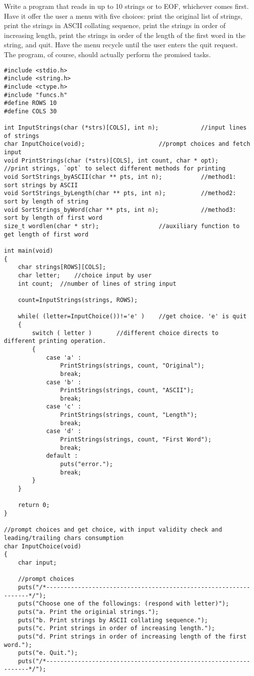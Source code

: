 \begin{question}
  Write a program that reads in up to 10 strings or to EOF, whichever comes first. Have it
  offer the user a menu with five choices: print the original list of strings, print the strings
  in ASCII collating sequence, print the strings in order of increasing length, print the
  strings in order of the length of the first word in the string, and quit. Have the menu
  recycle until the user enters the quit request. The program, of course, should actually
  perform the promised tasks.
\end{question}
\begin{solution}
  \begin{verbatim}
#include <stdio.h>
#include <string.h>
#include <ctype.h>
#include "funcs.h"
#define ROWS 10
#define COLS 30

int InputStrings(char (*strs)[COLS], int n);			//input lines of strings
char InputChoice(void);						//prompt choices and fetch input
void PrintStrings(char (*strs)[COLS], int count, char * opt);	//print strings, `opt` to select different methods for printing
void SortStrings_byASCII(char ** pts, int n);			//method1: sort strings by ASCII
void SortStrings_byLength(char ** pts, int n);			//method2: sort by length of string
void SortStrings_byWord(char ** pts, int n);			//method3: sort by length of first word
size_t wordlen(char * str);					//auxiliary function to get length of first word

int main(void)
{
	char strings[ROWS][COLS];
	char letter;	//choice input by user
	int count;	//number of lines of string input

	count=InputStrings(strings, ROWS);	

	while( (letter=InputChoice())!='e' )	//get choice. 'e' is quit
	{
		switch ( letter )		//different choice directs to different printing operation.
		{
			case 'a' :
				PrintStrings(strings, count, "Original");
				break;
			case 'b' :
				PrintStrings(strings, count, "ASCII");
				break;
			case 'c' :
				PrintStrings(strings, count, "Length");
				break;
			case 'd' :
				PrintStrings(strings, count, "First Word");
				break;
			default :
				puts("error.");
				break;
		}
	}

	return 0;
}

//prompt choices and get choice, with input validity check and leading/trailing chars consumption
char InputChoice(void)
{
	char input;

	//prompt choices
	puts("/*-----------------------------------------------------------------*/");
	puts("Choose one of the followings: (respond with letter)");
	puts("a. Print the originial strings.");
	puts("b. Print strings by ASCII collating sequence.");
	puts("c. Print strings in order of increasing length.");
	puts("d. Print strings in order of increasing length of the first word.");
	puts("e. Quit.");
	puts("/*-----------------------------------------------------------------*/");


\end{verbatim}
\end{solution}
